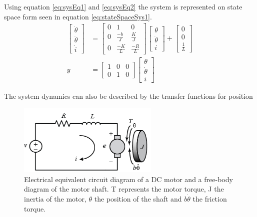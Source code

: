 \documentclass[../../main.tex]{subfiles}
\begin{document}
Using equation \ref{eq:sysEq1} and \ref{eq:sysEq2} the system is represented on state space form seen in equation \ref{eq:stateSpaceSys1}.
\begin{equation}\label{eq:stateSpaceSys1}
\begin{split}
\begin{bmatrix}
\dot{\theta}\\
\ddot{\theta}\\
\dot{i}
\end{bmatrix} &=
\begin{bmatrix}
0 & 1 & 0 \\
0 & \frac{-b}{J} & \frac{K}{J}\\
0 & \frac{-K}{L} & \frac{-R}{L}
\end{bmatrix}
\begin{bmatrix}
\theta\\
\dot{\theta}\\
i
\end{bmatrix}
+ 
\begin{bmatrix}
0 \\
0 \\
\frac{1}{L}
\end{bmatrix} \\
    y &= 
    \begin{bmatrix}
    1 & 0 & 0\\
    0 & 1 & 0
    \end{bmatrix}
    \begin{bmatrix}
    \theta\\
    \dot{\theta}\\
    i
    \end{bmatrix}
    \end{split}
\end{equation}

The system dynamics can also be described by the transfer functions for  position

\begin{figure}[H]
    \centering
    \includegraphics[width=0.6\textwidth]{Sections/System_Modelling/Images/Armature_Layout.PNG}
    \caption{Electrical equivalent circuit diagram of a DC motor and a free-body diagram of the motor shaft. T represents the motor torque, J the inertia of the motor, $\theta$ the position of the shaft and $b\dot{\theta}$ the friction torque. \cite{universityofmichigan2019}}
    \label{fig:Armature_Circuit}
\end{figure}
\end{document}
